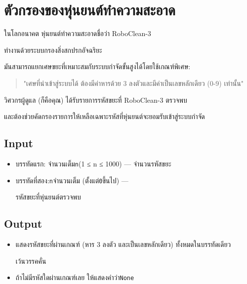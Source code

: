 \documentclass{article}
\begin{document}
\section*{ตัวกรองของหุ่นยนต์ทำความสะอาด}

ในโลกอนาคต หุ่นยนต์ทำความสะอาดชื่อว่า RoboClean-3

ทำงานด้วยระบบกรองสิ่งสกปรกอัจฉริยะ

มันสามารถแยกเศษขยะที่เหมาะสมกับระบบกำจัดขั้นสูงได้โดยใช้เกณฑ์พิเศษ:



\begin{quote}

"เศษที่นำเข้าสู่ระบบได้ ต้องมีค่าหารด้วย 3 ลงตัวและมีค่าเป็นเลขหลักเดียว (0-9) เท่านั้น"

\end{quote}



วิศวกรผู้ดูแล (ก็คือคุณ) ได้รับรายการรหัสขยะที่ RoboClean-3 ตรวจพบ

และต้องช่วยคัดกรองรายการให้เหลือเฉพาะรหัสที่หุ่นยนต์จะยอมรับเข้าสู่ระบบกำจัด



\subsection*{Input}
\begin{itemize}

\item

  บรรทัดแรก: จำนวนเต็ม\texttt{n}(1 ≤ n ≤ 1000) --- จำนวนรหัสขยะ

\item

  บรรทัดที่สอง:\texttt{n}จำนวนเต็ม (ตั้งแต่\texttt{0}ขึ้นไป) ---

  รหัสขยะที่หุ่นยนต์ตรวจพบ

\end{itemize}



\subsection*{Output}
\begin{itemize}

\item

  แสดงรหัสขยะที่ผ่านเกณฑ์ (หาร 3 ลงตัว และเป็นเลขหลักเดียว) ทั้งหมดในบรรทัดเดียว

  เว้นวรรคคั่น

\item

  ถ้าไม่มีรหัสใดผ่านเกณฑ์เลย ให้แสดงคำว่า\texttt{None}

\end{itemize}
\end{document}
